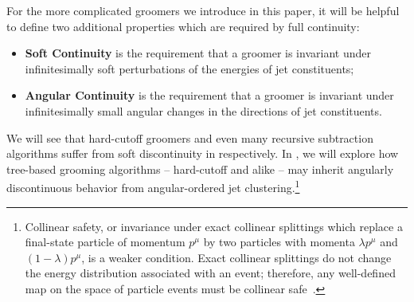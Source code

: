 For the more complicated \PIRANHA{} groomers we introduce in this paper, it will be helpful to define two additional properties which are required by full continuity:
\begin{itemize}
    \item
    \textbf{Soft Continuity} is the requirement that a groomer is invariant under infinitesimally soft perturbations of the energies of jet constituents;

    \item
    \textbf{Angular Continuity} is the requirement that a groomer is invariant under infinitesimally small angular changes in the directions of jet constituents.
\end{itemize}

We will see that hard-cutoff groomers and even many recursive subtraction algorithms suffer from soft discontinuity in  respectively.
%
In , we will explore how tree-based grooming algorithms -- hard-cutoff and \PIRANHA{} alike -- may inherit angularly discontinuous behavior from angular-ordered jet clustering.\footnote{
Collinear safety, or invariance under exact collinear splittings which replace a final-state particle of momentum \(p^\mu\) by two particles with momenta \(\lambda p^\mu\) and \((1-\lambda) p^\mu\), is a weaker condition.
%
Exact collinear splittings do not change the energy distribution associated with an event; therefore, any well-defined map on the space of particle events must be collinear safe~\cite{Komiske:2020qhg}.
}


